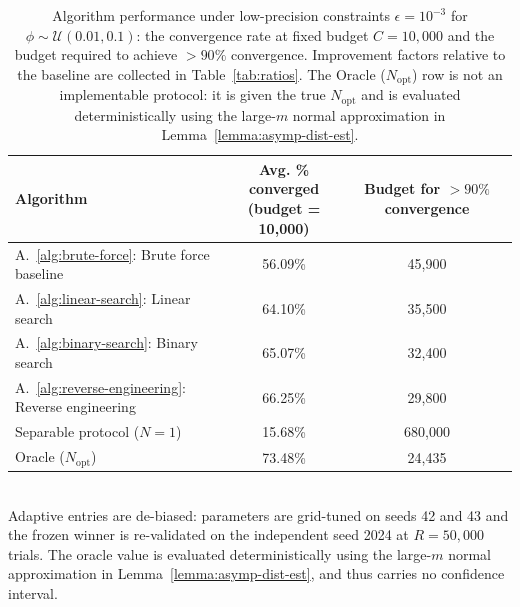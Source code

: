 \begin{table}[ht]
\centering
\caption{Algorithm performance under low-precision constraints $\epsilon=10^{-3}$ for $\phi\sim\mathcal{U}(0.01,0.1)$: the convergence rate at fixed budget $C=10{,}000$ and the budget required to achieve \(>90\%\) convergence. Improvement factors relative to the baseline are collected in Table~\ref{tab:ratios}. The Oracle ($N_\text{opt}$) row is not an implementable protocol: it is given the true $N_\text{opt}$ and is evaluated deterministically using the large-$m$ normal approximation in Lemma~\ref{lemma:asymp-dist-est}.}
\label{tab:summary-low-prec}
\begin{tabular}{lcc}
\toprule
Algorithm
& \makecell{Avg. \% converged \\ (budget = 10{,}000)}
& \makecell{Budget for $>90\%$ \\ convergence} \\
\midrule
A.~\ref{alg:brute-force}: Brute force baseline
& 56.09\%
& 45{,}900 \\
A.~\ref{alg:linear-search}: Linear search
& 64.10\%
& 35{,}500 \\
A.~\ref{alg:binary-search}: Binary search
& 65.07\%
& 32{,}400 \\
A.~\ref{alg:reverse-engineering}: Reverse engineering
& 66.25\%
& 29{,}800 \\
\midrule
Separable protocol ($N=1$)
& 15.68\%
& 680{,}000 \\
\midrule
Oracle ($N_\text{opt}$)
& 73.48\%
& 24{,}435 \\
\bottomrule
\end{tabular}
\\[2pt]
\footnotesize Adaptive entries are de-biased: parameters are grid-tuned on seeds 42 and 43 and the frozen winner is re-validated on the independent seed 2024 at $R=50{,}000$ trials. The oracle value is evaluated deterministically using the large-$m$ normal approximation in Lemma~\ref{lemma:asymp-dist-est}, and thus carries no confidence interval.
\end{table}
